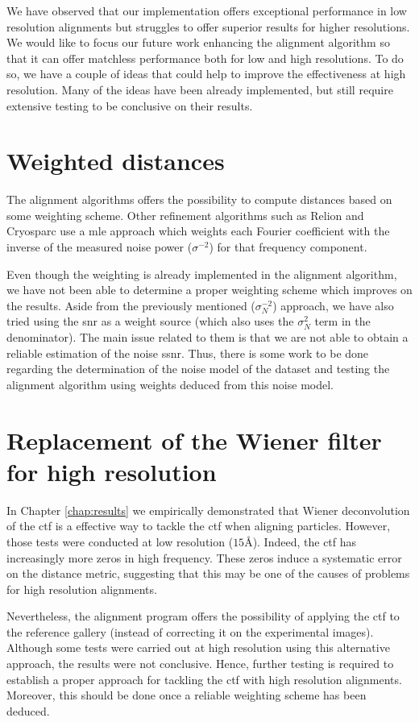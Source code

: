 \documentclass[../main.tex]{subfiles}
\begin{document}
We have observed that our implementation offers exceptional performance in low resolution alignments but struggles to offer superior results for higher resolutions. We would like to focus our future work enhancing the alignment algorithm so that it can offer matchless performance both for low and high resolutions.  To do so, we have a couple of ideas that could help to improve the effectiveness at high resolution. Many of the ideas have been already implemented, but still require extensive testing to be conclusive on their results.

\section{Weighted distances}
The alignment algorithms offers the possibility to compute distances based on some weighting scheme. Other refinement algorithms such as Relion and Cryosparc use a \gls{mle} approach which weights each Fourier coefficient with the inverse of the measured noise power ($\sigma^{-2}$) for that frequency component.

Even though the weighting is already implemented in the alignment algorithm, we have not been able to determine a proper weighting scheme which improves on the results. Aside from the previously mentioned ($\sigma_N^{-2}$) approach, we have also tried using the \gls{snr} as a weight source (which also uses the $\sigma_N^{2}$ term in the denominator). The main issue related to them is that we are not able to obtain a reliable estimation of the noise \gls{ssnr}. Thus, there is some work to be done regarding the determination of the noise model of the dataset and testing the alignment algorithm using weights deduced from this noise model.

\section{Replacement of the Wiener filter for high resolution}
In Chapter \ref{chap:results} we empirically demonstrated that Wiener deconvolution of the \gls{ctf} is a effective way to tackle the \gls{ctf} when aligning particles. However, those tests were conducted at low resolution ($15 \si{\angstrom}$). Indeed, the \gls{ctf} has increasingly more zeros in high frequency. These zeros induce a systematic error on the distance metric, suggesting that this may be one of the causes of problems for high resolution alignments.

Nevertheless, the alignment program offers the possibility of applying the \gls{ctf} to the reference gallery (instead of correcting it on the experimental images). Although some tests were carried out at high resolution using this alternative approach, the results were not conclusive. Hence, further testing is required to establish a proper approach for tackling the \gls{ctf} with high resolution alignments. Moreover, this should be done once a reliable weighting scheme has been deduced.
\end{document}
